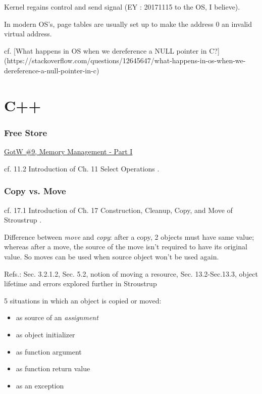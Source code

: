 \documentclass[10pt]{amsart}
\begin{document}
Kernel regains control and send signal (EY : 20171115 to the OS, I believe).   

In modern OS's, page tables are usually set up to make the address 0 an invalid virtual address.  

cf. [What happens in OS when we dereference a NULL pointer in C?](https://stackoverflow.com/questions/12645647/what-happens-in-os-when-we-dereference-a-null-pointer-in-c)

\part{C++}  

\section{Free Store}  


\href{http://www.gotw.ca/gotw/009.htm}{GotW \#9, Memory Management - Part I}



cf. 11.2 Introduction of Ch. 11 Select Operations \cite{Stro2013}.  




\section{Copy vs. Move}  
cf. 17.1 Introduction of Ch. 17 Construction, Cleanup, Copy, and Move of Stroustrup \cite{Stro2013}.  

Difference between \emph{move} and \emph{copy}: after a copy, 2 objects must have same value; whereas after a move, the source of the move isn't required to have its original value.  So moves can be used when source object won't be used again.  

Refs.: Sec. 3.2.1.2, Sec. 5.2, notion of moving a resource, Sec. 13.2-Sec.13.3, object lifetime and errors explored further in Stroustrup \cite{Stro2013}  


5 situations in which an object is copied or moved:   
\begin{itemize}
	\item as source of an \emph{assignment}
	\item as object initializer 
	\item as function argument
	\item as function return value
	\item as an exception  
\end{itemize}
\end{document}
